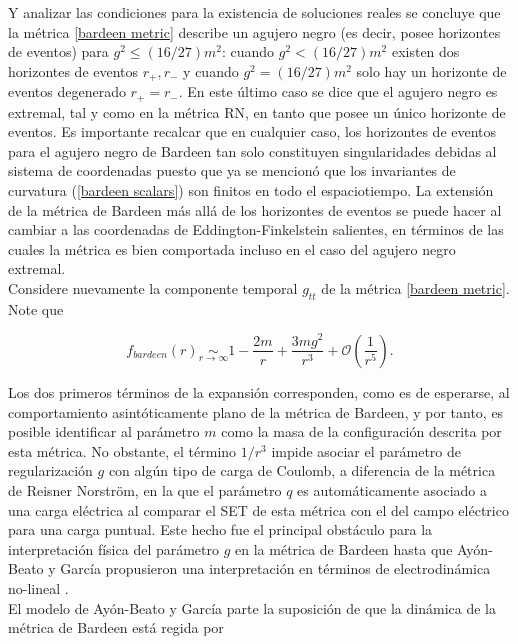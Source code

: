 \documentclass[16pt,a4paper]{article}
\numberwithin{equation}{section}
\theoremstyle{definition}
\begin{document}
Y analizar las condiciones para la existencia de soluciones reales se concluye que la métrica \eqref{bardeen metric} describe un agujero negro (es decir, posee horizontes de eventos) para $g^2 \leq (16/27)m^2$: cuando $g^2 < (16/27)m^2$ existen dos horizontes de eventos $r_{+},r_{-}$ y cuando $g^2 = (16/27)m^2$ solo hay un horizonte de eventos degenerado $r_{+} = r_{-}$. En este último caso se dice que el agujero negro es extremal, tal y como en la métrica RN, en tanto que posee un único horizonte de eventos. Es importante recalcar que en cualquier caso, los horizontes de eventos para el agujero negro de Bardeen tan solo constituyen singularidades debidas al sistema de coordenadas puesto que ya se mencionó que los invariantes de curvatura (\ref{bardeen scalars}) son finitos en todo el espaciotiempo. La extensión de la métrica de Bardeen más allá de los horizontes de eventos se puede hacer al cambiar a las coordenadas de Eddington-Finkelstein salientes, en términos de las cuales la métrica es bien comportada incluso en el caso del agujero negro extremal. \\

Considere nuevamente la componente temporal $g_{tt}$ de la métrica \eqref{bardeen metric}. Note que

\begin{equation}
f_{bardeen}(r) \underset{r \to \infty}{\sim} 1 - \frac{2m}{r} + \frac{3mg^2}{r^3} + \mathcal{O}\left( \frac{1}{r^5} \right).
\end{equation}

Los dos primeros términos de la expansión corresponden, como es de esperarse, al comportamiento asintóticamente plano de la métrica de Bardeen, y por tanto, es posible identificar al parámetro $m$ como la masa de la configuración descrita por esta métrica. No obstante, el término $1/r^3$ impide asociar el parámetro  de regularización $g$ con algún tipo de carga de Coulomb, a diferencia de la métrica de Reisner Norström, en la que el parámetro $q$ es automáticamente asociado a una carga eléctrica al comparar el SET de esta métrica con el del campo eléctrico para una carga puntual. Este hecho fue el principal obstáculo para la interpretación física del parámetro $g$ en la métrica de Bardeen hasta que Ayón-Beato y García propusieron una interpretación en términos de electrodinámica no-lineal \cite{ayon-beato2000}.\\

El modelo de Ayón-Beato y García parte la suposición de que la dinámica de la métrica de Bardeen está regida por
\end{document}
